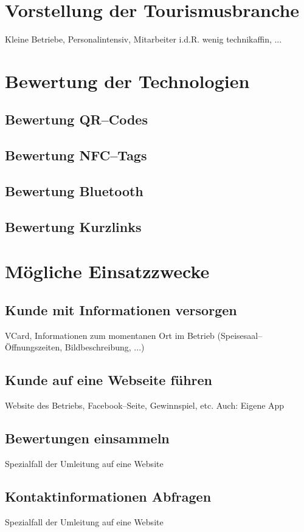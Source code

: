 \section{Vorstellung der Tourismusbranche}
\label{sec:hauptteil}

Kleine Betriebe, Personalintensiv, Mitarbeiter i.d.R. wenig technikaffin, ...

\section{Bewertung der Technologien}
\subsection{Bewertung QR–Codes}
\subsection{Bewertung NFC--Tags}
\subsection{Bewertung Bluetooth}
\subsection{Bewertung Kurzlinks}

\section{Mögliche Einsatzzwecke}
\subsection{Kunde mit Informationen versorgen}

VCard, Informationen zum momentanen Ort im Betrieb (Speisesaal--Öffnungszeiten, Bildbeschreibung, ...)

\subsection{Kunde auf eine Webseite führen}
Website des Betriebs, Facebook--Seite, Gewinnspiel, etc.
Auch: Eigene App

\subsection{Bewertungen einsammeln}
Spezialfall der Umleitung auf eine Website

\subsection{Kontaktinformationen Abfragen}
Spezialfall der Umleitung auf eine Website

